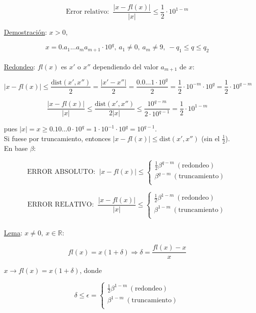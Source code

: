 $$\text{Error relativo: }\ \frac{|x - fl(x)|}{|x|} \leq \frac{1}{2}\cdot 10^{1 - m}$$

\underline{Demostraci\'on}: $x > 0$,

$$x = 0.a_{1}...a_{m}a_{m + 1}\cdot 10^{q},\ a_{1} \neq 0,\ a_{m} \neq 9,\ -q_{1} \leq q \leq q_{2}$$\\

\underline{Redondeo}: $fl(x)$ es $x'$ o $x''$ dependiendo del valor $a_{m + 1}$ de $x$:

$$|x - fl(x)| \leq \frac{\text{dist}(x', x'')}{2} = \frac{|x' - x''|}{2} = \frac{0.0...1\cdot 10^{q}}{2} = \frac{1}{2}\cdot 10^{-m}\cdot 10^{q} = \frac{1}{2}\cdot 10^{q - m}$$

$$\frac{|x - fl(x)|}{|x|} \leq \frac{\text{dist}(x', x'')}{2|x|} \leq \frac{10^{q - m}}{2\cdot 10^{q - 1}} = \frac{1}{2}\cdot 10^{1 - m}$$

pues $|x| = x \geq 0.10...0\cdot 10^{q} = 1\cdot 10^{-1}\cdot 10^{q} = 10^{q - 1}$.\\

Si fuese por truncamiento, entonces $|x - fl(x)| \leq \text{dist}(x', x'')$ (sin el $\frac{1}{2}$).\\

En base $\beta$:

$$\text{ERROR ABSOLUTO: }\ |x - fl(x)| \leq 
	\begin{cases}
        \frac{1}{2}\beta^{q - m}\ (\text{redondeo})\\
        \beta^{q - m}\ (\text{truncamiento})\\
    \end{cases}
$$

$$\text{ERROR RELATIVO: }\ \frac{|x - fl(x)|}{|x|} \leq 
	\begin{cases}
        \frac{1}{2}\beta^{1 - m}\ (\text{redondeo})\\
        \beta^{1 - m}\ (\text{truncamiento})\\
    \end{cases}
$$\\

\underline{Lema}: $x \neq 0,\ x \in \mathbb{R}$:

$$fl(x) = x(1 + \delta) \Rightarrow \delta = \frac{fl(x) - x}{x}$$

$x \rightarrow fl(x) = x(1 + \delta)$, donde

$$\delta \leq \epsilon =
	\begin{cases}
        \frac{1}{2}\beta^{1 - m}\ (\text{redondeo})\\
        \beta^{1 - m}\ (\text{truncamiento})\\
    \end{cases}
$$

